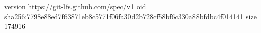 version https://git-lfs.github.com/spec/v1
oid sha256:7798e88ed7f63871eb8c5771f06fa30d2b728cf58bf6c330a88bfdbc4f014141
size 174916
